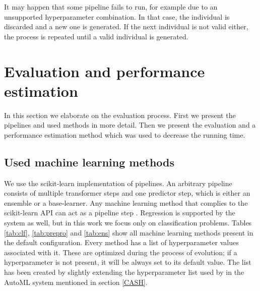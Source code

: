 It may happen that some pipeline fails to run, for example due to an
unsupported hyperparameter combination. In that case, the individual is
discarded and a new one is generated. If the next individual is not valid
either, the process is repeated until a valid individual is generated.

\section{Evaluation and performance estimation} \label{genens:eval}
In this section we elaborate on the evaluation process. First we present the
pipelines and used methods in more detail. Then we present the evaluation and
a performance estimation method which was used to decrease the running time.

\subsection{Used machine learning methods} \label{tab03:methods}
We use the scikit-learn implementation of pipelines. An arbitrary pipeline
consists of multiple transformer steps and one predictor step, which is either
an ensemble or a base-learner. Any machine learning method that complies to the
scikit-learn API can act as a pipeline step \citep{sklearn_api}. Regression is
supported by the system as well, but in this work we focus only on
classification problems. Tables \ref{tab:clf}, \ref{tab:prepro} and
\ref{tab:ens} show all machine learning methods present in the default
configuration. Every method has a list of hyperparameter values associated
with it. These are optimized during the process of evolution;
if a hyperparameter is not present, it will be always set to its default value.
The list has been created by slightly extending the hyperparameter list 
used by \cite{Kren2017AutomaticCO} in the AutoML system mentioned in
section \ref{CASH}. 

